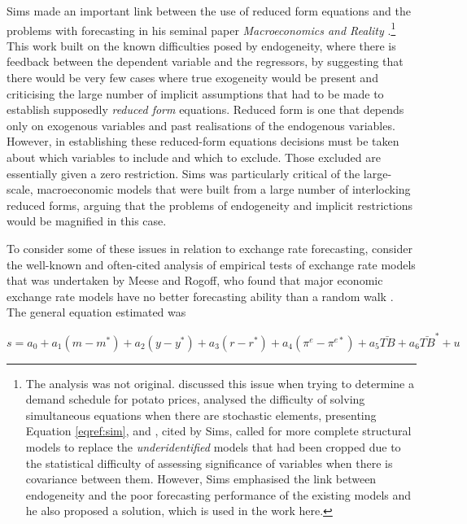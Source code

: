\documentclass[12pt, a4paper, oneside]{article}\usepackage[]{graphicx}\usepackage[]{color}
\begin{document}
Sims made an important link between the use of reduced form equations and the problems with forecasting in his seminal paper \emph{Macroeconomics and Reality} \citep{Sims1980Macroeconomics}.\footnote{The analysis was not original.  \citep{Working1925} discussed this issue when trying to determine a demand schedule for potato prices, \citep[p. 2]{Haavelmo1943} analysed the difficulty of solving simultaneous equations when there are stochastic elements, presenting Equation \ref{eqref:sim}, and \citep{Liu1960Identification}, cited by Sims, called for more complete structural models to replace the \emph{underidentified} models that had been cropped due to the statistical difficulty of assessing significance of variables when there is covariance between them. However, Sims emphasised the link between endogeneity and the poor forecasting performance of the existing models and he also proposed a solution, which is used in the work here.} 
This work built on the known difficulties posed by endogeneity, where there is feedback between the dependent variable and the regressors, by suggesting that there would be very few cases where true exogeneity would be present and criticising the large number of implicit assumptions that had to be made to establish supposedly \emph{reduced form} equations.  Reduced form is one that depends only on exogenous variables and past realisations of the endogenous variables.  However, in establishing these reduced-form equations decisions must be taken about which variables to include and which to exclude.  Those excluded are essentially given a zero restriction.   Sims was particularly critical of the large-scale, macroeconomic models that were built from a large number of interlocking reduced forms, arguing that the problems of endogeneity and implicit restrictions would be magnified in this case.  

To consider some of these issues in relation to exchange rate forecasting, consider the well-known and often-cited analysis of empirical tests of  exchange rate models that was undertaken by Meese and Rogoff, who found that major economic exchange rate models have no better forecasting ability than a random walk \citep{Meese1983Empirical}.  
The general equation estimated was

\begin{equation}\label{MeeseEmpirical}
s=a_{0}+a_{1}(m-m^*)+a_{2}(y-y^*)+a_{3}(r-r^*)
+a_{4}(\pi^e-\pi^{e*})+a_{5}\bar{TB}+a_{6}\bar{TB}^*+u
\end{equation}
\end{document}
